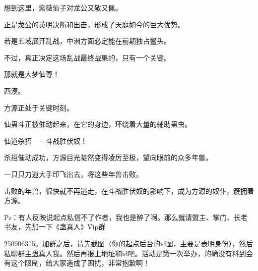 \begin{this_body}
想到这里，紫薇仙子对龙公又敬又佩。

正是龙公的英明决断和出击，形成了天庭如今的巨大优势。

若是五域展开乱战，中洲方面必定能在前期独占鳌头。

不过，真正决定这场乱战最终战果的，只有一个关键。

那就是大梦仙尊！

西漠。

方源正处于关键时刻。

仙蛊斗正被催动起来，在它的身边，环绕着大量的辅助蛊虫。

仙道杀招——斗战胜伏奴！

杀招催动成功，方源目光陡然变得凌厉至极，望向眼前的众多年兽。

一只只力道大手印飞出去，将这些年兽击败。

击败的年兽，很快就不再逃走，在斗战胜伏奴的影响下，成为方源的奴仆，簇拥着方源。

Ps：有人反映说起点私信不了作者，我也是醉了啊。那么就请盟主、掌门、长老书友，先加一下《蛊真人》Vip群

250906315。加群之后，请先截图（你的起点后台的id图，主要是表明身份），然后私聊群主蛊真人我。然后再报上地址和id吧。活动是第一次举办，的确没有料到会有这个限制，给大家造成了困扰，非常抱歉啊！

\end{this_body}

